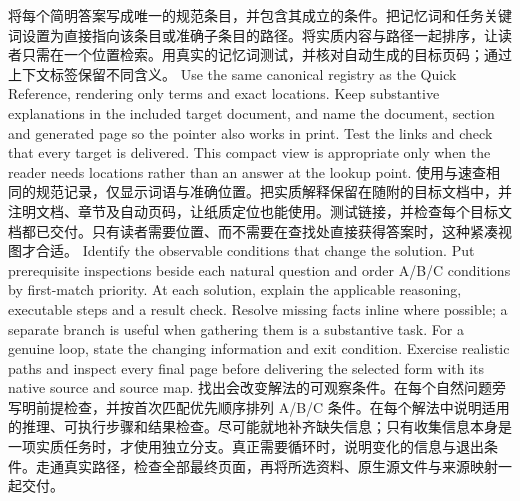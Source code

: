 { {将每个简明答案写成唯一的规范条目，并包含其成立的条件。把记忆词和任务关键词设置为直接指向该条目或准确子条目的路径。将实质内容与路径一起排序，让读者只需在一个位置检索。用真实的记忆词测试，并核对自动生成的目标页码；通过上下文标签保留不同含义。}
 {Use the same canonical registry as the Quick Reference, rendering only terms and exact locations. Keep substantive explanations in the included target document, and name the document, section and generated page so the pointer also works in print. Test the links and check that every target is delivered. This compact view is appropriate only when the reader needs locations rather than an answer at the lookup point.}
 {使用与速查相同的规范记录，仅显示词语与准确位置。把实质解释保留在随附的目标文档中，并注明文档、章节及自动页码，让纸质定位也能使用。测试链接，并检查每个目标文档都已交付。只有读者需要位置、而不需要在查找处直接获得答案时，这种紧凑视图才合适。}
 {Identify the observable conditions that change the solution. Put prerequisite inspections beside each natural question and order A/B/C conditions by first-match priority. At each solution, explain the applicable reasoning, executable steps and a result check. Resolve missing facts inline where possible; a separate branch is useful when gathering them is a substantive task. For a genuine loop, state the changing information and exit condition. Exercise realistic paths and inspect every final page before delivering the selected form with its native source and source map.}
 {找出会改变解法的可观察条件。在每个自然问题旁写明前提检查，并按首次匹配优先顺序排列 A/B/C 条件。在每个解法中说明适用的推理、可执行步骤和结果检查。尽可能就地补齐缺失信息；只有收集信息本身是一项实质任务时，才使用独立分支。真正需要循环时，说明变化的信息与退出条件。走通真实路径，检查全部最终页面，再将所选资料、原生源文件与来源映射一起交付。}
\ParallelEndEntry
}
